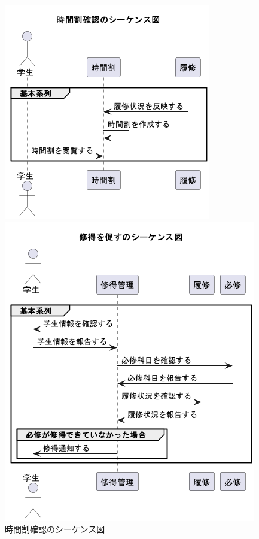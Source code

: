 \documentclass[documentclass]{jsarticle}
\begin{document}
\begin{figure}[H]
  \centering
  \begin{minipage}[b]{0.49\columnwidth}
      \centering
      \includegraphics[width=1.0\columnwidth]{figure/6-3.png}
      \caption{時間割確認のシーケンス図}
      \label{fig:6-3}
  \end{minipage}
  \begin{minipage}[b]{0.49\columnwidth}
      \centering
      \includegraphics[width=1.0\columnwidth]{figure/6-5.png}

\end{minipage}
\end{figure}
\end{document}
